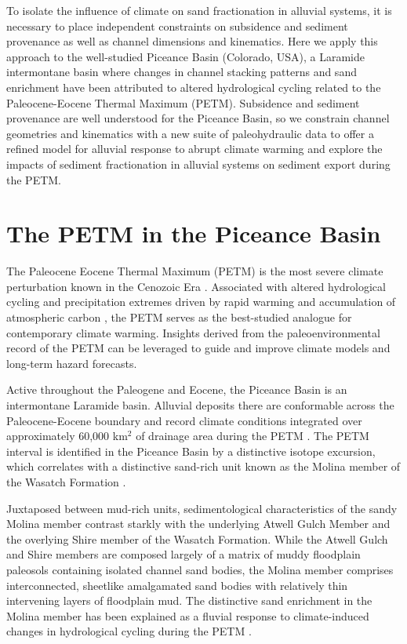 \documentclass[draft]{compact_proposal}
\newcommand{\del}[3]{\ce{\delta^#1#2_{#3}}}
\begin{document}
To isolate the influence of climate on sand fractionation in alluvial systems, it is necessary to place independent constraints on subsidence and sediment provenance as well as channel dimensions and kinematics.
Here we apply this approach to the well-studied Piceance Basin (Colorado, USA), a Laramide intermontane basin where changes in channel stacking patterns and sand enrichment have been attributed to altered hydrological cycling related to the Paleocene-Eocene Thermal Maximum (PETM).
Subsidence and sediment provenance are well understood for the Piceance Basin, so we constrain channel geometries and kinematics with a new suite of paleohydraulic data to offer a refined model for alluvial response to abrupt climate warming and explore the impacts of sediment fractionation in alluvial systems on sediment export during the PETM.

\section{The PETM in the Piceance Basin}

The Paleocene Eocene Thermal Maximum (PETM) is the most severe climate perturbation known in the Cenozoic Era \parencite{zachos_early_2008, slotnick_large_2012}.
Associated with altered hydrological cycling and precipitation extremes driven by rapid warming and accumulation of atmospheric carbon \parencite{carmichael_hydrological_2017}, the PETM serves as the best-studied analogue for contemporary climate warming.
Insights derived from the paleoenvironmental record of the PETM can be leveraged to guide and improve climate models and long-term hazard forecasts.

Active throughout the Paleogene and Eocene, the Piceance Basin is an intermontane Laramide basin.
Alluvial deposits there are conformable across the Paleocene-Eocene boundary and record climate conditions integrated over approximately 60,000 km$^2$ of drainage area during the PETM \cnote[johnson].
The PETM interval is identified in the Piceance Basin by a distinctive \del{13}{C}{} isotope excursion, which correlates with a distinctive sand-rich unit known as the Molina member of the Wasatch Formation \parencite{foreman_fluvial_2012}.

Juxtaposed between mud-rich units, sedimentological characteristics of the sandy Molina member contrast starkly with the underlying Atwell Gulch Member and the overlying Shire member of the Wasatch Formation.
While the Atwell Gulch and Shire members are composed largely of a matrix of muddy floodplain paleosols containing isolated channel sand bodies, the Molina member comprises interconnected, sheetlike amalgamated sand bodies with relatively thin intervening layers of floodplain mud.
The distinctive sand enrichment in the Molina member has been explained as a fluvial response to climate-induced changes in hydrological cycling during the PETM \parencite{foreman_fluvial_2012}.
\end{document}
